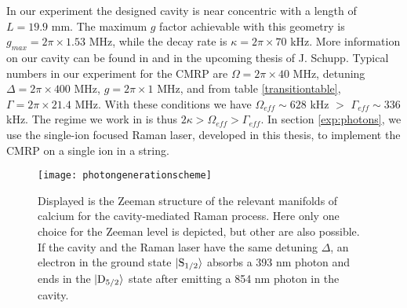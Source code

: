 In our experiment the designed cavity is near concentric with a length of $L = 19.9$ mm. The maximum $g$ factor achievable with this geometry is $g_{max} = 2\pi \times 1.53$ MHz, while the decay rate is $\kappa = 2\pi\times 70$ kHz. More information on our cavity can be found in \cite{Krutyanskiy2019} and in the upcoming thesis of J. Schupp. Typical numbers in our experiment for the CMRP are $\Omega =  2\pi\times 40$ MHz, detuning $\Delta = 2\pi\times 400$ MHz, $g = 2\pi\times 1$ MHz, and from table \ref{transitiontable}, $\Gamma = 2\pi \times 21.4$ MHz. With these conditions we have $\Omega_{eff} \sim 628$ kHz $>$ $\Gamma_{eff} \sim 336$ kHz. The regime we work in is thus $2\kappa>\Omega_{eff}>\Gamma_{eff}$. In section \ref{exp:photons}, we use the single-ion focused Raman laser, developed in this thesis, to implement the CMRP on a single ion in a string.
\begin{figure}
     \centering
     \texttt{[image: photongenerationscheme]}
    \caption{Displayed is the Zeeman structure of the relevant manifolds of calcium for the cavity-mediated Raman process. Here only one choice for the Zeeman level is depicted, but other are also possible. If the cavity and the Raman laser have the same detuning $\Delta$, an electron in the ground state $\ket{\text{S}_{1/2}}$ absorbs a 393 nm photon and ends in the $\ket{\text{D}_{5/2}}$ state after emitting a 854 nm photon in the cavity.}
      \label{ramanprocess}
\end{figure}



